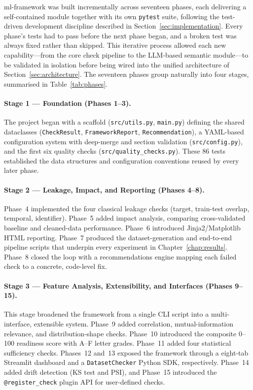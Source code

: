 \documentclass[12pt,a4paper]{report}
\begin{document}
ml-framework was built incrementally across seventeen phases, each delivering a
self-contained module together with its own \texttt{pytest} suite, following the
test-driven development discipline described in Section~\ref{sec:implementation}.  Every
phase's tests had to pass before the next phase began, and a broken test was always fixed
rather than skipped.  This iterative process allowed each new capability---from the core
check pipeline to the LLM-based semantic module---to be validated in isolation before being
wired into the unified architecture of Section~\ref{sec:architecture}.  The seventeen phases
group naturally into four stages, summarised in Table~\ref{tab:phases}.

\paragraph{Stage 1 --- Foundation (Phases 1--3).}  The project began with a scaffold
(\texttt{src/utils.py}, \texttt{main.py}) defining the shared dataclasses
(\texttt{CheckResult}, \texttt{FrameworkReport}, \texttt{Recommendation}), a YAML-based
configuration system with deep-merge and section validation (\texttt{src/config.py}), and
the first six quality checks (\texttt{src/quality\_checks.py}).  These 86 tests established
the data structures and configuration conventions reused by every later phase.

\paragraph{Stage 2 --- Leakage, Impact, and Reporting (Phases 4--8).}  Phase~4 implemented
the four classical leakage checks (target, train-test overlap, temporal, identifier).
Phase~5 added impact analysis, comparing cross-validated baseline and cleaned-data
performance.  Phase~6 introduced Jinja2/Matplotlib HTML reporting.  Phase~7 produced the
dataset-generation and end-to-end pipeline scripts that underpin every experiment in
Chapter~\ref{chap:results}.  Phase~8 closed the loop with a recommendations engine mapping
each failed check to a concrete, code-level fix.

\paragraph{Stage 3 --- Feature Analysis, Extensibility, and Interfaces (Phases 9--15).}
This stage broadened the framework from a single CLI script into a multi-interface,
extensible system.  Phase~9 added correlation, mutual-information relevance, and
distribution-shape checks.  Phase~10 introduced the composite 0--100 readiness score with
A--F letter grades.  Phase~11 added four statistical sufficiency checks.  Phases~12 and~13
exposed the framework through a eight-tab Streamlit dashboard and a \texttt{DatasetChecker}
Python SDK, respectively.  Phase~14 added drift detection (KS test and PSI), and Phase~15
introduced the \texttt{@register\_check} plugin API for user-defined checks.
\end{document}
